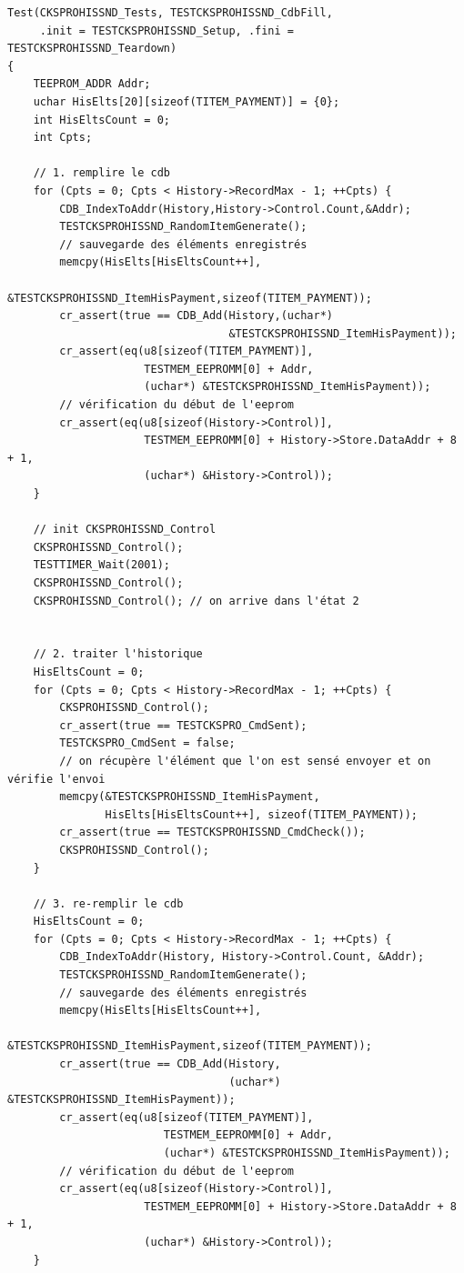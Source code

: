 \documentclass[a4paper]{article}
\begin{document}
\begin{verbatim}
Test(CKSPROHISSND_Tests, TESTCKSPROHISSND_CdbFill,
     .init = TESTCKSPROHISSND_Setup, .fini = TESTCKSPROHISSND_Teardown)
{
    TEEPROM_ADDR Addr;
    uchar HisElts[20][sizeof(TITEM_PAYMENT)] = {0};
    int HisEltsCount = 0;
    int Cpts;

    // 1. remplire le cdb
    for (Cpts = 0; Cpts < History->RecordMax - 1; ++Cpts) {
        CDB_IndexToAddr(History,History->Control.Count,&Addr);
        TESTCKSPROHISSND_RandomItemGenerate();
        // sauvegarde des éléments enregistrés
        memcpy(HisElts[HisEltsCount++],
               &TESTCKSPROHISSND_ItemHisPayment,sizeof(TITEM_PAYMENT));
        cr_assert(true == CDB_Add(History,(uchar*)
                                  &TESTCKSPROHISSND_ItemHisPayment));
        cr_assert(eq(u8[sizeof(TITEM_PAYMENT)],
                     TESTMEM_EEPROMM[0] + Addr,
                     (uchar*) &TESTCKSPROHISSND_ItemHisPayment));
        // vérification du début de l'eeprom
        cr_assert(eq(u8[sizeof(History->Control)],
                     TESTMEM_EEPROMM[0] + History->Store.DataAddr + 8 + 1,
                     (uchar*) &History->Control));
    }

    // init CKSPROHISSND_Control
    CKSPROHISSND_Control();
    TESTTIMER_Wait(2001);
    CKSPROHISSND_Control();
    CKSPROHISSND_Control(); // on arrive dans l'état 2


    // 2. traiter l'historique
    HisEltsCount = 0;
    for (Cpts = 0; Cpts < History->RecordMax - 1; ++Cpts) {
        CKSPROHISSND_Control();
        cr_assert(true == TESTCKSPRO_CmdSent);
        TESTCKSPRO_CmdSent = false;
        // on récupère l'élément que l'on est sensé envoyer et on vérifie l'envoi
        memcpy(&TESTCKSPROHISSND_ItemHisPayment,
               HisElts[HisEltsCount++], sizeof(TITEM_PAYMENT));
        cr_assert(true == TESTCKSPROHISSND_CmdCheck());
        CKSPROHISSND_Control();
    }

    // 3. re-remplir le cdb
    HisEltsCount = 0;
    for (Cpts = 0; Cpts < History->RecordMax - 1; ++Cpts) {
        CDB_IndexToAddr(History, History->Control.Count, &Addr);
        TESTCKSPROHISSND_RandomItemGenerate();
        // sauvegarde des éléments enregistrés
        memcpy(HisElts[HisEltsCount++],
               &TESTCKSPROHISSND_ItemHisPayment,sizeof(TITEM_PAYMENT));
        cr_assert(true == CDB_Add(History,
                                  (uchar*) &TESTCKSPROHISSND_ItemHisPayment));
        cr_assert(eq(u8[sizeof(TITEM_PAYMENT)],
                        TESTMEM_EEPROMM[0] + Addr,
                        (uchar*) &TESTCKSPROHISSND_ItemHisPayment));
        // vérification du début de l'eeprom
        cr_assert(eq(u8[sizeof(History->Control)],
                     TESTMEM_EEPROMM[0] + History->Store.DataAddr + 8 + 1,
                     (uchar*) &History->Control));
    }


\end{verbatim}
\end{document}
